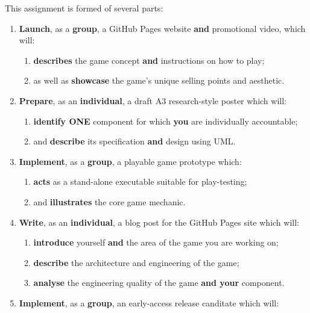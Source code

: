 \documentclass{../../fal_assignment}
\begin{document}
This assignment is formed of several parts:

\begin{enumerate}[label=(\Alph*)]
    \item \textbf{Launch}, as a \textbf{group}, a GitHub Pages website \textbf{and} promotional video, which will:
    	\begin{enumerate}[label=\roman*.]
    		\item \textbf{describes} the game concept \textbf{and} instructions on how to play;
    		\item as well as \textbf{showcase} the game's unique selling points and aesthetic.
	\end{enumerate}
    \item \textbf{Prepare}, as an \textbf{individual}, a draft A3 research-style poster which will:
    	\begin{enumerate}[label=\roman*.]
    	    	\item \textbf{identify ONE} component for which \textbf{you} are individually accountable;
    		\item and \textbf{describe} its specification \textbf{and} design using UML.
	\end{enumerate}
    \item \textbf{Implement}, as a \textbf{group}, a playable game prototype which:
    	\begin{enumerate}[label=\roman*.]
    		\item \textbf{acts} as a stand-alone executable suitable for play-testing;
    		\item and \textbf{illustrates} the core game mechanic.
	\end{enumerate}
    \item \textbf{Write}, as an \textbf{individual}, a blog post for the GitHub Pages site which will:
    	\begin{enumerate}[label=\roman*.]
    		\item \textbf{introduce} yourself \textbf{and} the area of the game you are working on;
		\item \textbf{describe} the architecture and engineering of the game;
    		\item \textbf{analyse} the engineering quality of the game \textbf{and your} component.
	\end{enumerate}	
    \item \textbf{Implement}, as a \textbf{group}, an early-access release canditate which will:
    	\begin{enumerate}[label=\roman*.]

\end{enumerate}
\end{enumerate}
\end{document}
